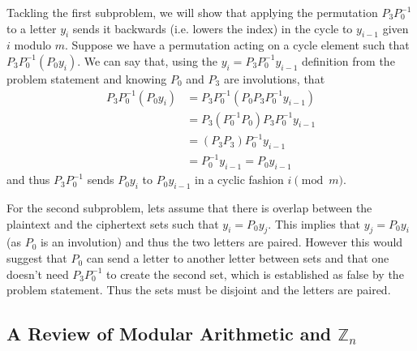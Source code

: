 \documentclass[12pt]{article}
\newenvironment{answer}
    {\begin{adjustwidth}{0pt}{0pt}}
    {\end{adjustwidth}}
\theoremstyle{remark}  %
\begin{document}
    \begin{answer}
        Tackling the first subproblem, we will show that applying the permutation $P_3P_0^{-1}$ to a letter $y_i$ sends it backwards (i.e. lowers the index) in the cycle to $y_{i-1}$ given $i$ modulo $m$. Suppose we have a permutation acting on a cycle element such that $P_3P_0^{-1}(P_0y_i)$. We can say that, using the $y_i= P_3P_0^{-1}y_{i-1}$ definition from the problem statement and knowing $P_0$ and $P_3$ are involutions, that
        \begin{align*}
            P_3P_0^{-1}(P_0y_i) &= P_3P_0^{-1}(P_0P_3P_0^{-1}y_{i-1}) \\
            &= P_3(P_0^{-1}P_0)P_3P_0^{-1}y_{i-1} \\
            &= (P_3P_3)P_0^{-1}y_{i-1} \\
            &= P_0^{-1}y_{i-1} = P_0y_{i-1}
        \end{align*}
        and thus $P_3P_0^{-1}$ sends $P_0y_i$ to $P_0y_{i-1}$ in a cyclic fashion $i\pmod{m}$. \par For the second subproblem, lets assume that there is overlap between the plaintext and the ciphertext sets such that $y_i=P_0y_j$. This implies that $y_j=P_0y_i$ (as $P_0$ is an involution) and thus the two letters are paired. However this would suggest that $P_0$ can send a letter to another letter between sets and that one doesn't need $P_3P_0^{-1}$ to create the second set, which is established as false by the problem statement. Thus the sets must be disjoint and the letters are paired.
    \end{answer}

\subsection{A Review of Modular Arithmetic and $\mathbb{Z}_n$}
\end{document}
